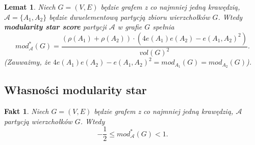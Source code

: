 \documentclass[letterpaper,12pt]{article}
\newtheorem{fact}{Fakt}
\newtheorem{lemma}{Lemat}
\begin{document}
\begin{lemma}
  \label{2partition_star}
  Niech \(G = (V, E)\) będzie grafem z co najmniej jedną krawędzią, \(\mathcal{A}=\{A_1,A_2\} \) będzie dwuelementową partycją zbioru wierzchołków \(G\). Wtedy \textbf{modularity star score} partycji \(\mathcal{A}\) w grafie \(G\) spełnia
  \[mod^*_{\mathcal{A}}(G) = \frac{(\rho(A_1)+\rho(A_2))\cdot(4e(A_1)e(A_2)-e(A_1,A_2)^2)}{vol(G)^2}.\]
  (Zauważmy, że \(4e(A_1)e(A_2)-e(A_1,A_2)^2=mod_{A_1}(G)=mod_{A_2}(G)\)).
\end{lemma}


\subsection{Własności modularity star}
\begin{fact}
  Niech \(G = (V,E)\) będzie grafem z co najmniej jedną krawędzią, \(\mathcal{A}\) partycją wierzchołków \(G\). Wtedy
  \[-\frac{1}{2} \leq mod_{\mathcal{A}}^*(G) < 1.\]
\end{fact}
\end{document}
